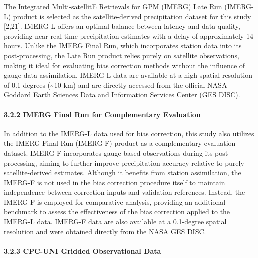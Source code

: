 \documentclass[
]{article}
\begin{document}
The Integrated Multi-satellitE Retrievals for GPM (IMERG) Late Run
(IMERG-L) product is selected as the satellite-derived precipitation
dataset for this study {[}2,21{]}. IMERG-L offers an optimal balance
between latency and data quality, providing near-real-time precipitation
estimates with a delay of approximately 14 hours. Unlike the IMERG Final
Run, which incorporates station data into its post-processing, the Late
Run product relies purely on satellite observations, making it ideal for
evaluating bias correction methods without the influence of gauge data
assimilation. IMERG-L data are available at a high spatial resolution of
0.1 degrees (\textasciitilde10 km) and are directly accessed from the
official NASA Goddard Earth Sciences Data and Information Services
Center (GES DISC).

\paragraph{3.2.2 IMERG Final Run for Complementary
Evaluation}\label{imerg-final-run-for-complementary-evaluation}

In addition to the IMERG-L data used for bias correction, this study
also utilizes the IMERG Final Run (IMERG-F) product as a complementary
evaluation dataset. IMERG-F incorporates gauge-based observations during
its post-processing, aiming to further improve precipitation accuracy
relative to purely satellite-derived estimates. Although it benefits
from station assimilation, the IMERG-F is not used in the bias
correction procedure itself to maintain independence between correction
inputs and validation references. Instead, the IMERG-F is employed for
comparative analysis, providing an additional benchmark to assess the
effectiveness of the bias correction applied to the IMERG-L data.
IMERG-F data are also available at a 0.1-degree spatial resolution and
were obtained directly from the NASA GES DISC.

\paragraph{3.2.3 CPC-UNI Gridded Observational
Data}\label{cpc-uni-gridded-observational-data}
\end{document}
